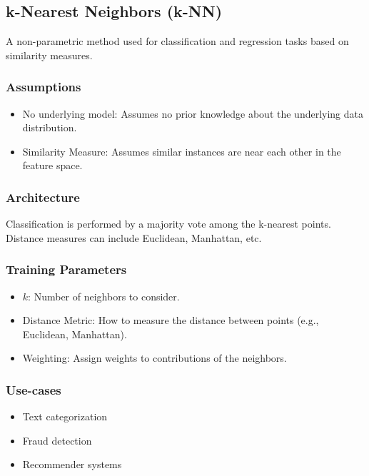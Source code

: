 \documentclass[english]{latex4ei/latex4ei_sheet}
\begin{document}
\begin{sectionbox}
\subsection{k-Nearest Neighbors (k-NN)}

A non-parametric method used for classification and regression tasks based on similarity measures.

\subsubsection{Assumptions}
\begin{itemize}
    \item No underlying model: Assumes no prior knowledge about the underlying data distribution.
    \item Similarity Measure: Assumes similar instances are near each other in the feature space.
\end{itemize}

\subsubsection{Architecture}
Classification is performed by a majority vote among the k-nearest points. Distance measures can include Euclidean, Manhattan, etc.

\subsubsection{Training Parameters}
\begin{itemize}
    \item \( k \): Number of neighbors to consider.
    \item Distance Metric: How to measure the distance between points (e.g., Euclidean, Manhattan).
    \item Weighting: Assign weights to contributions of the neighbors.
\end{itemize}

\subsubsection{Use-cases}
\begin{itemize}
    \item Text categorization
    \item Fraud detection
    \item Recommender systems
\end{itemize}


\end{sectionbox}
\end{document}
